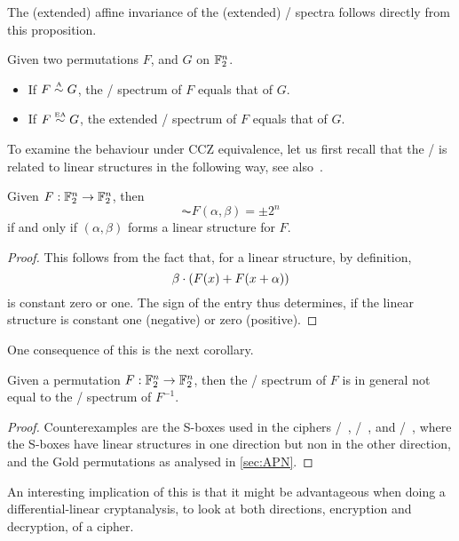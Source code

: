 The (extended) affine invariance of the (extended) \ACT/ spectra follows directly from this proposition.
\begin{corollary}
    Given two permutations $F$, and $G$ on $\mathbb{F}_2^n$.
    \begin{itemize}
        \item If $F \stackrel{\text{\tiny A}}{\sim} G$, the \ACT/ spectrum of $F$ equals that of $G$.
        \item If $F \stackrel{\text{\tiny EA}}{\sim} G$, the extended \ACT/ spectrum of $F$ equals that of $G$.
    \end{itemize}
\end{corollary}

To examine the behaviour under CCZ equivalence, let us first recall that the \ACT/ is related to linear structures in the following way, see also~.
\begin{lemma}\label{act:lem:ls}
    Given $F : \mathbb{F}_2^n \to \mathbb{F}_2^n$, then
    \begin{equation*}
        \AC{F}(\alpha, \beta) = \pm 2^{n}
    \end{equation*}
    if and only if $(\alpha, \beta)$ forms a linear structure for $F$.
\end{lemma}
\begin{proof}
    This follows from the fact that, for a linear structure, by definition,
    \begin{equation*}
        \beta \cdot (F(x) + F(x+\alpha))
    \end{equation*}
    is constant zero or one.
    The sign of the entry thus determines, if the linear structure is constant one (negative) or zero (positive).
\end{proof}

One consequence of this is the next corollary.
\begin{corollary}[Inversion]\label{cor:act:inversion}
    Given a permutation $F : \mathbb{F}_2^n \to \mathbb{F}_2^n$, then the \ACT/ spectrum of $F$ is in general not equal to the \ACT/ spectrum of $F^{-1}$.
\end{corollary}
\begin{proof}
    Counterexamples are the S-boxes used in the ciphers \safer/~, /~, and \fides/~, where the S-boxes have linear structures in one direction but non in the other direction, and the Gold permutations as analysed in \cref{sec:APN}.
\end{proof}
An interesting implication of this is that it might be advantageous when doing a differential-linear cryptanalysis, to look at both directions, encryption and decryption, of a cipher.

